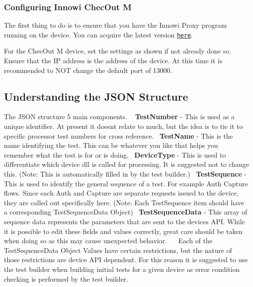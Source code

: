 \subsubsection*{Configuring Innowi Chec\+Out M}

The first thing to do is to ensure that you have the Innowi Proxy program running on the device. You can acquire the latest version \href{https://drive.google.com/open?id=1tLhps5Omh3cAksSa9tZ0VLZi6SMUOsn3}{\tt here}.~\newline


For the Chec\+Out M device, set the settings as shown if not already done so. Ensure that the IP address is the address of the device. At this time it is recommended to N\+OT change the default port of 13000.~\newline




\subsection*{Understanding the J\+S\+ON Structure}

 The J\+S\+ON structure 5 main components. ~\newline
 {\bfseries Test\+Number} -\/ This is used as a unique identifier. At present it doesn\textquotesingle{}t relate to much, but the idea is to tie it to specific processor test numbers for cross reference.~\newline
 {\bfseries Test\+Name} -\/ This is the name identifying the test. This can be whatever you like that helps you remember what the test is for or is doing.~\newline
 {\bfseries Device\+Type} -\/ This is used to differentiate which device dll is called for processing. It is suggested not to change this. (Note\+: This is automatically filled in by the test builder.)~\newline
 {\bfseries Test\+Sequence} -\/ This is used to identify the general sequence of a test. For example Auth Capture flows. Since each Auth and Capture are separate requests issued to the device, they are called out specifically here. (Note\+: Each Test\+Sequence item should have a corresponding Test\+Sequence\+Data Object)~\newline
 {\bfseries Test\+Sequence\+Data} -\/ This array of sequence data represents the parameters that are sent to the device\textquotesingle{}s A\+PI. While it is possible to edit these fields and values correctly, great care should be taken when doing so as this may cause unexpected behavior.~\newline
 ~\newline
 Each of the Test\+Sequence\+Data Object Values have certain restrictions, but the nature of those restrictions are device A\+PI dependent. For this reason it is suggested to use the test builder when building initial tests for a given device as error condition checking is performed by the test builder.~\newline


